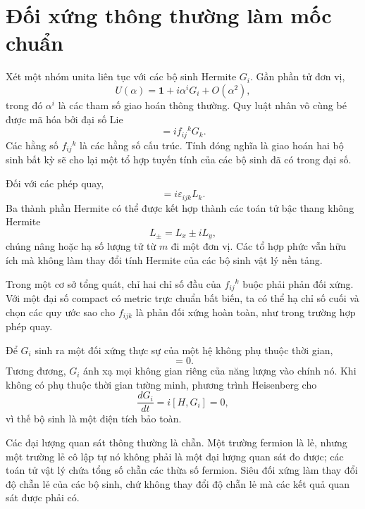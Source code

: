 \section{Đối xứng thông thường làm mốc chuẩn}

Xét một nhóm unita liên tục với các bộ sinh Hermite \(G_i\). Gần phần tử đơn vị,
\begin{equation}
U(\alpha)=\mathbf 1+i\alpha^iG_i+O(\alpha^2),
\end{equation}
trong đó \(\alpha^i\) là các tham số giao hoán thông thường. Quy luật nhân vô cùng bé được mã hóa bởi đại số Lie
\begin{equation}
[G_i,G_j]=i f_{ij}{}^{k}G_k.
\end{equation}
Các hằng số \(f_{ij}{}^k\) là các hằng số cấu trúc. Tính đóng nghĩa là giao hoán hai bộ sinh bất kỳ sẽ cho lại một tổ hợp tuyến tính của các bộ sinh đã có trong đại số.

Đối với các phép quay,
\begin{equation}
[L_i,L_j]=i\varepsilon_{ijk}L_k.
\end{equation}
Ba thành phần Hermite có thể được kết hợp thành các toán tử bậc thang không Hermite
\begin{equation}
L_\pm=L_x\pm iL_y,
\end{equation}
chúng nâng hoặc hạ số lượng tử từ \(m\) đi một đơn vị. Các tổ hợp phức vẫn hữu ích mà không làm thay đổi tính Hermite của các bộ sinh vật lý nền tảng.

Trong một cơ sở tổng quát, chỉ hai chỉ số đầu của \(f_{ij}{}^k\) buộc phải phản đối xứng. Với một đại số compact có metric trực chuẩn bất biến, ta có thể hạ chỉ số cuối và chọn các quy ước sao cho \(f_{ijk}\) là phản đối xứng hoàn toàn, như trong trường hợp phép quay. 

Để \(G_i\) sinh ra một đối xứng thực sự của một hệ không phụ thuộc thời gian,
\begin{equation}
[H,G_i]=0.
\end{equation}
Tương đương, \(G_i\) ánh xạ mọi không gian riêng của năng lượng vào chính nó. Khi không có phụ thuộc thời gian tường minh, phương trình Heisenberg cho
\begin{equation}
\frac{dG_i}{dt}=i[H,G_i]=0,
\end{equation}
vì thế bộ sinh là một điện tích bảo toàn.

Các đại lượng quan sát thông thường là chẵn. Một trường fermion là lẻ, nhưng một trường lẻ cô lập tự nó không phải là một đại lượng quan sát đo được; các toán tử vật lý chứa tổng số chẵn các thừa số fermion. Siêu đối xứng làm thay đổi độ chẵn lẻ của các bộ sinh, chứ không thay đổi độ chẵn lẻ mà các kết quả quan sát được phải có.

